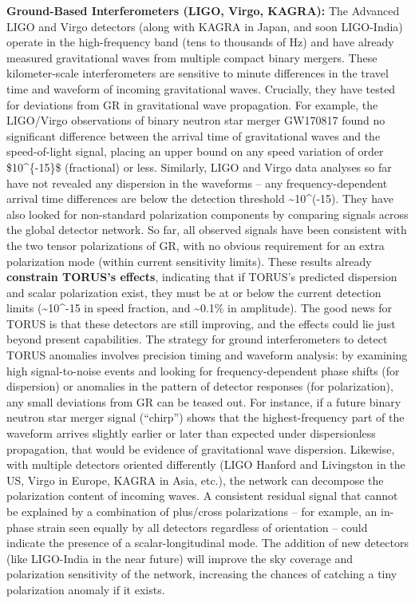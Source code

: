 \documentclass[
]{article}
\begin{document}
\textbf{Ground-Based Interferometers (LIGO, Virgo, KAGRA):} The Advanced
LIGO and Virgo detectors (along with KAGRA in Japan, and soon
LIGO-India) operate in the high-frequency band (tens to thousands of Hz)
and have already measured gravitational waves from multiple compact
binary mergers. These kilometer-scale interferometers are sensitive to
minute differences in the travel time and waveform of incoming
gravitational waves. Crucially, they have tested for deviations from GR
in gravitational wave propagation. For example, the LIGO/Virgo
observations of binary neutron star merger GW170817 found no significant
difference between the arrival time of gravitational waves and the
speed-of-light signal, placing an upper bound on any speed variation of
order \$10\^{}\{-15\}\$ (fractional) or less\hspace{0pt}. Similarly,
LIGO and Virgo data analyses so far have not revealed any dispersion in
the waveforms -- any frequency-dependent arrival time differences are
below the detection threshold \textasciitilde10\^{}(-15)\hspace{0pt}.
They have also looked for non-standard polarization components by
comparing signals across the global detector network. So far, all
observed signals have been consistent with the two tensor polarizations
of GR, with no obvious requirement for an extra polarization mode
(within current sensitivity limits). These results already
\textbf{constrain TORUS's effects}, indicating that if TORUS's predicted
dispersion and scalar polarization exist, they must be at or below the
current detection limits (\textasciitilde10\^{}-15 in speed fraction,
and \textasciitilde0.1\% in amplitude). The good news for TORUS is that
these detectors are still improving, and the effects could lie just
beyond present capabilities\hspace{0pt}. The strategy for ground
interferometers to detect TORUS anomalies involves precision timing and
waveform analysis: by examining high signal-to-noise events and looking
for frequency-dependent phase shifts (for dispersion) or anomalies in
the pattern of detector responses (for polarization), any small
deviations from GR can be teased out. For instance, if a future binary
neutron star merger signal (``chirp'') shows that the highest-frequency
part of the waveform arrives slightly earlier or later than expected
under dispersionless propagation, that would be evidence of
gravitational wave dispersion. Likewise, with multiple detectors
oriented differently (LIGO Hanford and Livingston in the US, Virgo in
Europe, KAGRA in Asia, etc.), the network can decompose the polarization
content of incoming waves. A consistent residual signal that cannot be
explained by a combination of plus/cross polarizations -- for example,
an in-phase strain seen equally by all detectors regardless of
orientation -- could indicate the presence of a scalar-longitudinal
mode. The addition of new detectors (like LIGO-India in the near future)
will improve the sky coverage and polarization sensitivity of the
network, increasing the chances of catching a tiny polarization anomaly
if it exists\hspace{0pt}.
\end{document}
